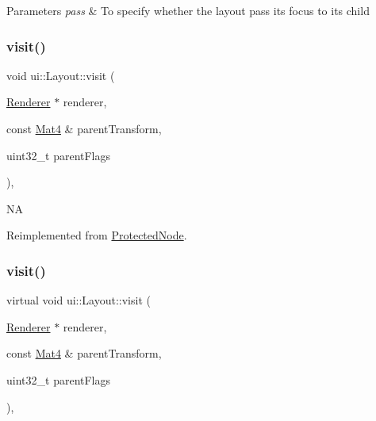 \begin{DoxyParams}{Parameters}
{\em pass} & To specify whether the layout pass its focus to its child \\
\hline
\end{DoxyParams}
\mbox{\label{classui_1_1Layout_a46a4f4f4836e1b9c985acb26f8fa4163}} 
\subsubsection{\texorpdfstring{visit()}{visit()}\hspace{0.1cm}{\footnotesize\ttfamily [1/2]}}
{\footnotesize\ttfamily void ui\+::\+Layout\+::visit (\begin{DoxyParamCaption}\item[{\hyperlink{classRenderer}{Renderer} $\ast$}]{renderer,  }\item[{const \hyperlink{classMat4}{Mat4} \&}]{parent\+Transform,  }\item[{uint32\+\_\+t}]{parent\+Flags }\end{DoxyParamCaption})\hspace{0.3cm}{\ttfamily [override]}, {\ttfamily [virtual]}}

NA 

Reimplemented from \hyperlink{classProtectedNode_afb1b2f3712d91a38bd5c691eeec6bbb9}{Protected\+Node}.

\mbox{\label{classui_1_1Layout_a7857b109e0d674106c9fe22830ef4076}} 
\subsubsection{\texorpdfstring{visit()}{visit()}\hspace{0.1cm}{\footnotesize\ttfamily [2/2]}}
{\footnotesize\ttfamily virtual void ui\+::\+Layout\+::visit (\begin{DoxyParamCaption}\item[{\hyperlink{classRenderer}{Renderer} $\ast$}]{renderer,  }\item[{const \hyperlink{classMat4}{Mat4} \&}]{parent\+Transform,  }\item[{uint32\+\_\+t}]{parent\+Flags }\end{DoxyParamCaption})\hspace{0.3cm}{\ttfamily [override]}, {\ttfamily [virtual]}}

